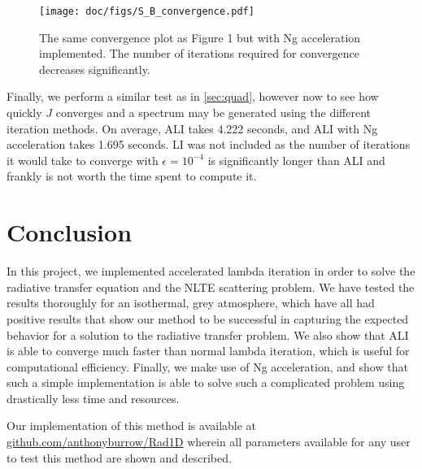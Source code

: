 \documentclass[12pt]{article}
\begin{document}
\begin{figure}[ht]
 \centering
 \texttt{[image: doc/figs/S\_B\_convergence.pdf]}
 \caption{The same convergence plot as Figure 1 but with Ng acceleration implemented. The number of iterations required for convergence decreases significantly.}
  \label{fig:7}
\end{figure}

Finally, we perform a similar test as in \autoref{sec:quad}, however now to see how quickly $J$ converges and a spectrum may be generated using the different iteration methods. On average, ALI takes 4.222 seconds, and ALI with Ng acceleration takes 1.695 seconds. LI was not included as the number of iterations it would take to converge with $\epsilon = 10^{-4}$ is significantly longer than ALI and frankly is not worth the time spent to compute it.


\section{Conclusion}


In this project, we implemented accelerated lambda iteration in order to solve the radiative transfer equation and the NLTE scattering problem. We have tested the results thoroughly for an isothermal, grey atmosphere, which have all had positive results that show our method to be successful in capturing the expected behavior for a solution to the radiative transfer problem. We also show that ALI is able to converge much faster than normal lambda iteration, which is useful for computational efficiency. Finally, we make use of Ng acceleration, and show that such a simple implementation is able to solve such a complicated problem using drastically less time and resources.

Our implementation of this method is available at \href{https://github.com/anthonyburrow/Rad1D}{github.com/anthonyburrow/Rad1D} wherein all parameters available for any user to test this method are shown and described.


\clearpage

\end{document}
